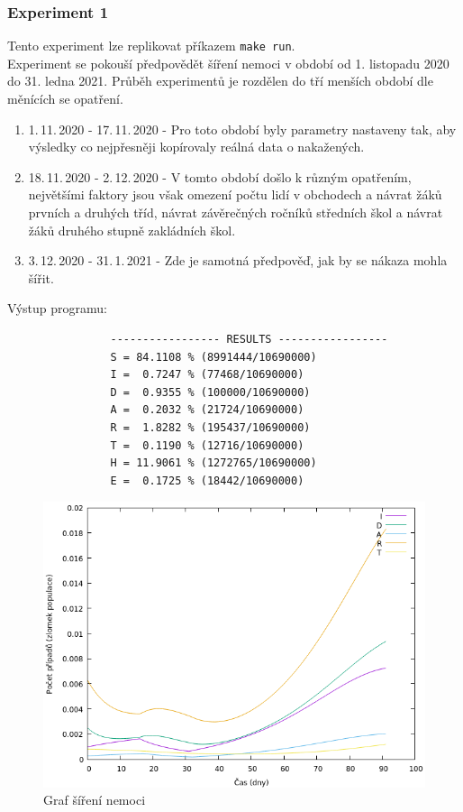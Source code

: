 \documentclass[a4paper,11pt]{article}
\begin{document}
		\subsubsection{Experiment 1}
		\label{ec1}
			Tento experiment lze replikovat příkazem \texttt{make run}.\\
			
			Experiment se pokouší předpovědět šíření nemoci v období od 1. listopadu 2020 do 31. ledna 2021. Průběh experimentů je rozdělen do tří menších období dle měnících se opatření.
			
			\begin{enumerate}
				\item 1.\,11.\,2020 - 17.\,11.\,2020 - Pro toto období byly parametry nastaveny tak, aby výsledky co nejpřesněji kopírovaly reálná data o nakažených.
				\item 18.\,11.\,2020 - 2.\,12.\,2020 - V tomto období došlo k různým opatřením, největšími faktory jsou však omezení počtu lidí v obchodech a návrat žáků prvních a druhých tříd, návrat závěrečných ročníků středních škol a návrat žáků druhého stupně zakládních škol.
				\item 3.\,12.\,2020 - 31.\,1.\,2021 - Zde je samotná předpověď, jak by se nákaza mohla šířit.
			\end{enumerate}
			
		\noindent Výstup programu:
			\begin{verbatim}
				----------------- RESULTS -----------------
				S = 84.1108 % (8991444/10690000)
				I =  0.7247 % (77468/10690000)
				D =  0.9355 % (100000/10690000)
				A =  0.2032 % (21724/10690000)
				R =  1.8282 % (195437/10690000)
				T =  0.1190 % (12716/10690000)
				H = 11.9061 % (1272765/10690000)
				E =  0.1725 % (18442/10690000)
			\end{verbatim}
		
			\begin{figure}[H]
				\caption{Graf šíření nemoci}
				\label{fig4}
				\centering
				\includegraphics[scale=0.6]{exp_cz1.png}
			\end{figure}
		
\end{document}
